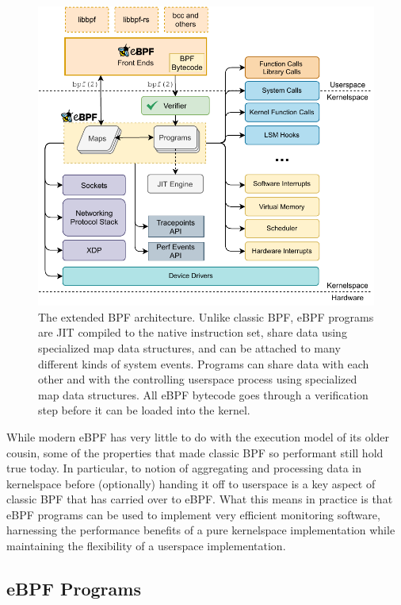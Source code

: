 \begin{figure}[tbp]
  \centering
  \includegraphics[width=0.8\linewidth]{figs/background/ebpf.pdf}
  \caption[The extended BPF architecture]{The extended BPF architecture. Unlike classic
  BPF, eBPF programs are JIT compiled to the native instruction set, share data using
  specialized map data structures, and can be attached to many different kinds of system
  events. Programs can share data with each other and with the controlling userspace
  process using specialized map data structures. All eBPF bytecode goes through
  a verification step before it can be loaded into the kernel.}%
  \label{fig:extended-bpf}
\end{figure}

While modern eBPF has very little to do with the execution model of its older cousin, some
of the properties that made classic BPF so performant still hold true today. In
particular, to notion of aggregating and processing data in kernelspace before
(optionally) handing it off to userspace is a key aspect of classic BPF that has carried
over to eBPF. What this means in practice is that eBPF programs can be used to implement
very efficient monitoring software, harnessing the performance benefits of a pure
kernelspace implementation while maintaining the flexibility of a userspace
implementation.

\subsection{eBPF Programs}%
\label{ss:bpf-programs-bg}

